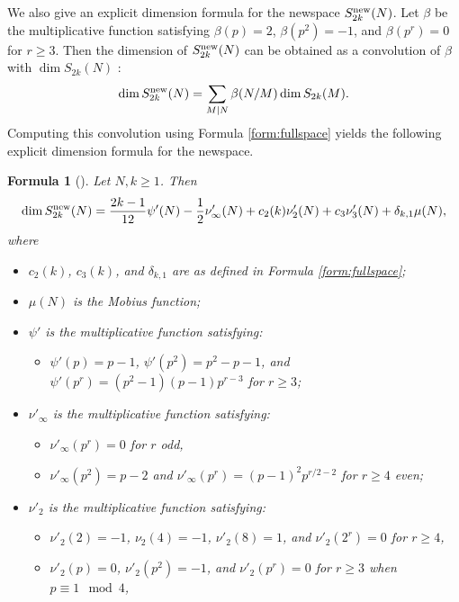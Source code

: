 \documentclass[12pt,letterpaper,reqno]{amsart}
\newtheorem{formula}[theorem]{Formula}
\theoremstyle{definition}
\numberwithin{equation}{section}
\numberwithin{figure}{section}
\numberwithin{table}{section}
\newcommand{\lrp}[1]{\left(#1\right)}
\newcommand{\nw}{{\textnormal{new}}}
\begin{document}
We also give an explicit dimension formula for the newspace $S_{2k}^\nw(N)$. 
Let $\beta$ be the multiplicative function satisfying $\beta(p) = 2$, $\beta(p^2) = -1$, and $\beta(p^r)=0$ for $r \ge 3$. Then the dimension of $S_{2k}^\nw(N)$ can be obtained as a convolution of $\beta$ with $\dim S_{2k}(N)$ \cite[Corollary 13.3.7]{cohen-stromberg}:
\begin{align}
    \dim S_{2k}^\nw(N) = \sum_{M \mid N} \beta(N/M) \dim S_{2k}(M).
\end{align}
Computing this convolution using Formula \ref{form:fullspace} yields the following explicit dimension formula for the newspace.
\begin{formula}[{\cite[Theorem 1]{martin}}] \label{form:newspace}
    Let $N,k \ge 1$. Then
    \begin{align}
        \dim S_{2k}^\nw(N) = \frac{2k-1}{12} \psi'(N) - \frac12 \nu_\infty'(N) + c_2(k) \nu'_2(N) + c_3 \nu'_3(N) + \delta_{k,1} \mu(N),
    \end{align}
    where
    \begin{itemize}
        \item $c_2(k)$, $c_3(k)$, and $ \delta_{k,1}$ are as defined in Formula \ref{form:fullspace};
        \item $\mu(N)$ is the Mobius function; 
        \item $\psi'$ is the multiplicative function satisfying:
        \begin{itemize}
            \item $\psi'(p) = p-1$, $\psi'(p^2) = p^2-p-1$, 
            and $\psi'(p^r) = \lrp{p^2-1}\lrp{p-1} p^{r-3}$ for $r \ge 3$;
        \end{itemize}
        \item $\nu'_\infty$ is the multiplicative function satisfying:
        \begin{itemize}
            \item $\nu'_\infty(p^r) = 0$ for $r$ odd,
            \item $\nu'_\infty(p^2) = p-2$ and $\nu'_\infty(p^r) = (p-1)^2 p^{r/2-2} $ for $r \ge 4$ even;
        \end{itemize}
        \item $\nu'_2$ is the multiplicative function satisfying:
        \begin{itemize}
            \item $\nu'_2(2) = -1$, $\nu_2(4) = -1$, $\nu'_2(8)=1$, and $\nu'_2(2^r) = 0$ for $r \ge 4$,
            \item $\nu'_2(p)=0$, $\nu'_2(p^2) = -1$, and $\nu'_2(p^r)=0$ for $r \ge 3$ when $p \equiv 1 \mod 4$,

\end{itemize}
\end{itemize}
\end{formula}
\end{document}
